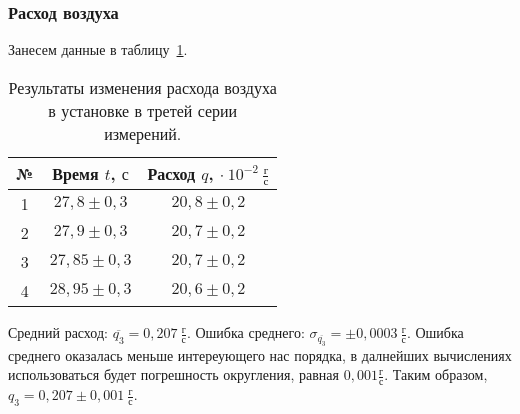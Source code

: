 \documentclass[a4paper,11pt]{article}
\begin{document}
\subsubsection{Расход воздуха}
Занесем данные в таблицу~\ref{table:tab5}.
\begin{table}[h!]
\centering
\begin{tabular}{ ||c|c|c|| }
  \hline
  № & Время $t$, $с$ & Расход $q$, $\cdot\ 10^{-2}\ \frac{г}{с}$ \\
  \hline
  1 & $27,8 \pm 0,3$ & $20,8 \pm 0,2$ \\
  2 & $27,9 \pm 0,3$ & $20,7 \pm 0,2$ \\
  3 & $27,85 \pm 0,3$ & $20,7 \pm 0,2$ \\
  4 & $28,95 \pm 0,3$ & $20,6 \pm 0,2$ \\
  \hline
\end{tabular}
\caption{Результаты изменения расхода воздуха в установке в третей серии измерений.}
\label{table:tab5}
\end{table}
\newline
Средний расход: $\overline{q_{3}} = 0,207\ \frac{г}{с}$.\newline
Ошибка среднего: $\sigma_{\overline{q_{3}}} = \pm 0,0003\ \frac{г}{с}$.\newline
Ошибка среднего оказалась меньше интереующего нас порядка, в далнейших вычислениях использоваться будет погрешность округления, равная $0,001\frac{г}{с}$.
Таким образом, $q_{3} = 0,207 \pm 0,001\ \frac{г}{с}$.
\end{document}
